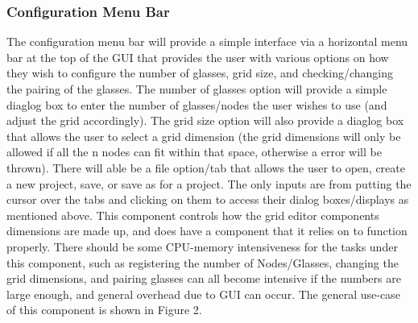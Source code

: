 \documentclass[12pt]{article}
\begin{document}
			\subsubsection {Configuration Menu Bar}
			\forceindent The configuration menu bar will provide a simple interface via a horizontal menu bar at the top of the GUI that provides the user with various options on how they wish to configure the number of glasses, grid size, and checking/changing the pairing of the glasses. The number of glasses option will provide a simple diaglog box to enter the number of glasses/nodes the user wishes to use (and adjust the grid accordingly). The grid size option will also provide a diaglog box that allows the user to select a grid dimension (the grid dimensions will only be allowed if all the n nodes can fit within that space, otherwise a error will be thrown). There will able be a file option/tab that allows the user to open, create a new project, save, or save as for a project. %
		    The only inputs are from putting the cursor over the tabs and clicking on them to access their dialog boxes/displays as mentioned above. This component controls how the grid editor components dimensions are made up, and does have a component that it relies on to function properly. There should be some CPU-memory intensiveness for the tasks under this component, such as registering the number of Nodes/Glasses, changing the grid dimensions, and pairing glasses can all become intensive if the numbers are large enough, and general overhead due to GUI can occur. The general use-case of this component is shown in Figure 2.
			
\end{document}
